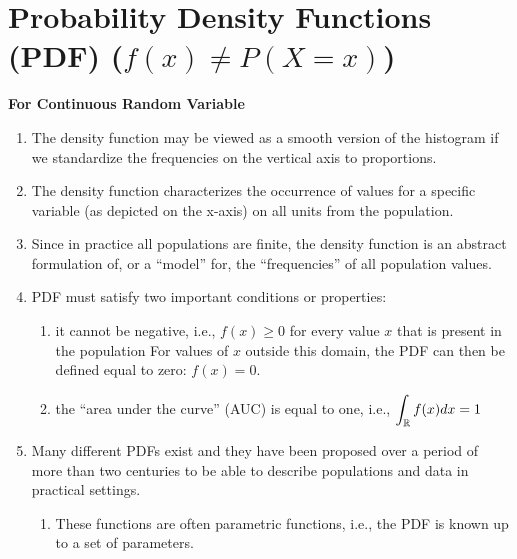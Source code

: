 \section{Probability Density Functions (PDF) ($f(x) \neq P(X = x)$)}

\textbf{For Continuous Random Variable}

\begin{enumerate}
    \item The density function may be viewed as a smooth version of the histogram if we standardize the frequencies on the vertical axis to proportions.
    \hfill \cite{statistics/book/Statistics-for-Data-Scientists/Maurits-Kaptein}

    \item The density function characterizes the occurrence of values for a specific variable (as depicted on the x-axis) on all units from the population.
    \hfill \cite{statistics/book/Statistics-for-Data-Scientists/Maurits-Kaptein}

    \item Since in practice all populations are finite, the density function is an abstract formulation of, or a “model” for, the “frequencies” of all population values.
    \hfill \cite{statistics/book/Statistics-for-Data-Scientists/Maurits-Kaptein}

    \item PDF must satisfy two important conditions or properties:
    \hfill \cite{statistics/book/Statistics-for-Data-Scientists/Maurits-Kaptein}
    \begin{enumerate}
        \item  it cannot be negative, i.e., $f (x) \geq 0$ for every value $x$ that is present in the population
        For values of $x$ outside this domain, the PDF can then be defined equal to zero: $f (x) = 0$.
        \hfill \cite{statistics/book/Statistics-for-Data-Scientists/Maurits-Kaptein}

        \item  the “area under the curve” (AUC) is equal to one, i.e., $\displaystyle\int_{\mathbb{R}} f(x) dx = 1$
        \hfill \cite{statistics/book/Statistics-for-Data-Scientists/Maurits-Kaptein}
    \end{enumerate}

    \item Many different PDFs exist and they have been proposed over a period of more than two centuries to be able to describe populations and data in practical settings.
    \hfill \cite{statistics/book/Statistics-for-Data-Scientists/Maurits-Kaptein}
    \begin{enumerate}
        \item These functions are often parametric functions, i.e., the PDF is known up to a set of parameters.
        \hfill \cite{statistics/book/Statistics-for-Data-Scientists/Maurits-Kaptein}


\end{enumerate}
\end{enumerate}
